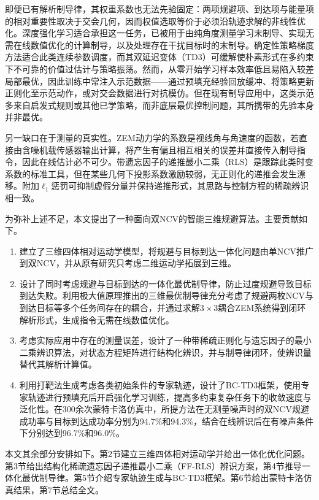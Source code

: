 即便已有解析制导律，其权重系数也无法先验固定：两项规避项、到达项与能量项的相对重要性取决于交会几何，因而权值选取等价于必须沿轨迹求解的非线性优化。深度强化学习适合承担这一任务，已被用于由纯角度测量学习末制导\cite{gaudet2020}、实现无需在线数值优化的计算制导\cite{he2021}，以及处理存在干扰目标时的末制导\cite{deng2023}。确定性策略梯度方法适合此类连续参数调度\cite{lillicrap2016}，而其双延迟变体（TD3）可缓解使朴素形式在多约束下不可靠的价值过估计与策略振荡\cite{fujimoto2018}。然而，从零开始学习样本效率低且易陷入较差局部最优，因此训练中常注入示范数据——通过预填充经验回放缓冲\cite{hester2018,vecerik2017}、将策略更新正则化至示范动作\cite{fujimoto2021}，或对交会数据进行对抗模仿\cite{hu2022,hui2025}。但在现有制导应用中，这类示范多来自启发式规则或其他已学策略，而非底层最优控制问题，其所携带的先验本身并非最优。

另一缺口在于测量的真实性。ZEM动力学的系数是视线角与角速度的函数，若直接由含噪机载传感器输出计算，将产生有偏且相互相关的误差并直接传入制导指令，因此在线估计必不可少\cite{liu2025}。带遗忘因子的递推最小二乘（RLS）是跟踪此类时变系数的标准工具\cite{paleologu2008,bruce2020}，但在某些几何下投影系数激励较弱，无正则化的递推会发生漂移。附加$\ell_1$惩罚可抑制虚假分量并保持递推形式\cite{angelosante2010}，其思路与控制方程的稀疏辨识相一致\cite{brunton2016}。

为弥补上述不足，本文提出了一种面向双NCV的智能三维规避算法。主要贡献如下。

\begin{enumerate}
\item 建立了三维四体相对运动学模型，将规避与目标到达一体化问题由单NCV推广到双NCV，并从原有研究只考虑二维运动学拓展到三维。
\item 设计了同时考虑规避与目标到达的一体化最优制导律，防止过度规避导致目标到达失败。利用极大值原理推出的三维最优制导律充分考虑了规避两枚NCV与到达目标等多个任务间存在的耦合，并通过求解$3\times 3$耦合ZEM系统得到闭环解析形式，生成指令无需在线数值优化。
\item 考虑实际应用中存在的测量误差，设计了一种带稀疏正则化与遗忘因子的最小二乘辨识算法，对状态方程矩阵进行结构化辨识，并与制导律闭环，使辨识量替代其解析计算值。
\item 利用打靶法生成考虑各类初始条件的专家轨迹，设计了BC-TD3框架，使用专家轨迹进行预填充后开启强化学习训练，提高多约束复杂任务下的收敛速度与泛化性。在300余次蒙特卡洛仿真中，所提方法在无测量噪声时的双NCV规避成功率与目标到达成功率分别为94.7\%和94.3\%，结合在线辨识后在有噪声条件下分别达到96.7\%和96.0\%。
\end{enumerate}

本文其余部分安排如下。第2节建立三维四体相对运动学并给出一体化优化问题。第3节给出结构化稀疏遗忘因子递推最小二乘（FF-RLS）辨识方案，第4节推导一体化最优制导律。第5节介绍专家轨迹生成与BC-TD3框架。第6节给出蒙特卡洛仿真结果，第7节总结全文。
